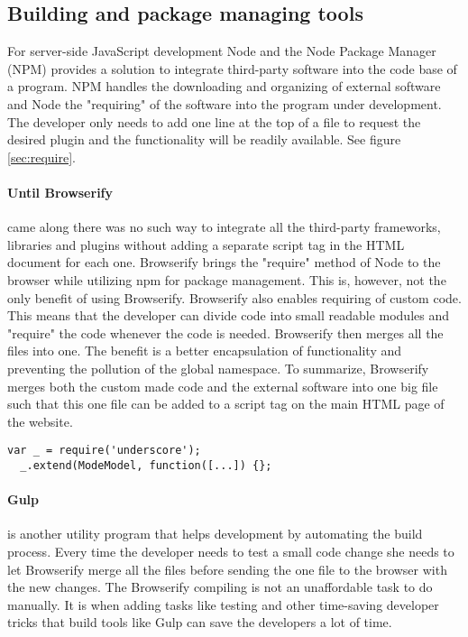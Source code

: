 \documentclass[english]{ifimaster}
\begin{document}
\subsection{Building and package managing tools}
For server-side JavaScript development Node \parencite{node} and the Node Package Manager (NPM) \parencite{npm} provides a solution to integrate third-party software into the code base of a program. NPM handles the downloading and organizing of external software and Node the "requiring" of the software into the program under development. The developer only needs to add one line at the top of a file to request the desired plugin and the functionality will be readily available. See figure \ref{sec:require}.

\paragraph{Until Browserify} came along there was no such way to integrate all the third-party frameworks, libraries and plugins without adding a separate script tag in the HTML document for each one. Browserify brings the "require" method of Node to the browser while utilizing npm for package management. This is, however, not the only benefit of using Browserify. Browserify also enables requiring of custom code. This means that the developer can divide code into small readable modules and "require" the code whenever the code is needed. Browserify then merges all the files into one. The benefit is a better encapsulation of functionality and preventing the pollution of the global namespace. To summarize, Browserify merges both the custom made code and the external software into one big file such that this one file can be added to a script tag on the main HTML page of the website.

\label{sec:require}
\begin{lstlisting}[caption=Example of the Browserify require statement.]
  var _ = require('underscore');
  _.extend(ModeModel, function([...]) {};
\end{lstlisting}

\paragraph{Gulp} is another utility program that helps development by automating the build process. Every time the developer needs to test a small code change she needs to let Browserify merge all the files before sending the one file to the browser with the new changes. The Browserify compiling is not an unaffordable task to do manually. It is when adding tasks like testing and other time-saving developer tricks that build tools like Gulp can save the developers a lot of time. 
\end{document}
